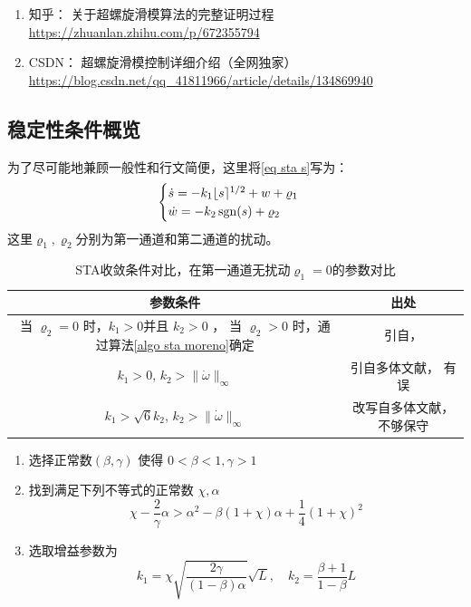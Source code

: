 

\begin{enumerate}
	\item 知乎： 关于超螺旋滑模算法的完整证明过程 \url{https://zhuanlan.zhihu.com/p/672355794}
	\item CSDN： 超螺旋滑模控制详细介绍（全网独家） \url{https://blog.csdn.net/qq_41811966/article/details/134869940}
\end{enumerate}

\subsection{稳定性条件概览}

为了尽可能地兼顾一般性和行文简便，这里将\eqref{eq sta s}写为：
\begin{equation}
	\begin{cases}
		\dot{s}=-k_1 \lfloor s \rceil^{1/2}+w+\varrho_1\\
		\dot{w}=-k_2 \mathop{\mathrm{sgn}} (s)+\varrho_2
	\end{cases}
\end{equation}
这里$\varrho_1,\varrho_2$分别为第一通道和第二通道的扰动。

\begin{table}[!htb]
	\centering
	\begin{tabular}{c|c}
		\hline
		参数条件  & 出处 
		\\\hline  
		\makecell{
		当 $\varrho_2=0$ 时，$k_1>0$并且 $k_2>0$ ，\\
		当 $\varrho_2>0$ 时，通过算法\ref{algo sta moreno}确定
		}
		&
			\makecell{
			引自\cite[algorithm 1]{morenoStrictLyapunovFunctions2012}，\\
			\cite[第五章]{YangGaoJieHuaMoKongZhiLiLunJiQiZaiQianQuDongXiTongZhongDeYingYongYanJiu2016}
		}
		\\\hline
		$k_1 >0$,
		$k_2>\|\dot{\omega}\|_\infty$& 
		引自多体文献\cite{fengFinitetimeDistributedConvex2020}，
		有误
		\\\hline
		$k_1 >\sqrt{6} k_2$,
		$k_2>\|\dot{\omega}\|_\infty$&
		改写自多体文献\cite{chenDistributedFinitetimeDifferentiator2024}，
		不够保守
		\\\hline
	\end{tabular}
	\caption{STA收敛条件对比，在第一通道无扰动$\varrho_1=0$的参数对比}
\end{table}

\begin{algo}\label{algo sta moreno}
	\begin{enumerate}
		\item  选择正常数$(\beta,\gamma)$ 使得 $0<\beta<1,\gamma>1$
		\item 找到满足下列不等式的正常数 $\chi,\alpha$
		\begin{equation}
			\chi-\frac{2}{\gamma}\alpha
			>\alpha^2-\beta (1+\chi)\alpha+\frac14 (1+\chi)^2
		\end{equation}
		\item 选取增益参数为
		\begin{equation}
			k_1=\chi \sqrt{\frac{2\gamma}{(1-\beta)\alpha}}\sqrt{L},\quad 
			k_2=\frac{\beta+1}{1-\beta}L
		\end{equation}
	\end{enumerate}
\end{algo}